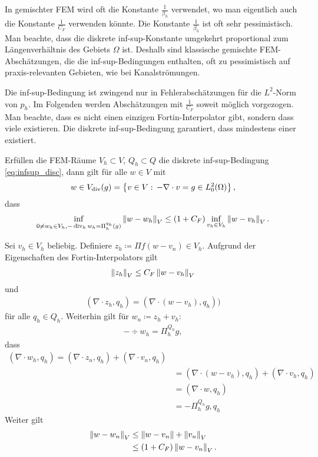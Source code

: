 \begin{bemerkung*}
  In gemischter FEM wird oft die Konstante $\frac 1 {\beta_{h}}$ verwendet, wo man eigentlich auch die Konstante $\frac 1{C_{F}}$ verwenden könnte. Die Konstante $\frac 1 {\beta_{h}}$ ist oft sehr pessimistisch. Man beachte, dass die diskrete inf-sup-Konstante umgekehrt proportional zum Längenverhältnis des Gebiets $\Omega$ ist. Deshalb sind klassische gemischte FEM-Abschätzungen, die die inf-sup-Bedingungen enthalten, oft zu pessimistisch auf praxis-relevanten Gebieten, wie bei Kanalströmungen. 

Die inf-sup-Bedingung ist zwingend nur in Fehlerabschätzungen für die $L^{2}$-Norm von $p_{h}$. Im Folgenden werden Abschätzungen mit $\frac 1 {C_{F}}$ soweit möglich vorgezogen. Man beachte, dass es nicht einen einzigen Fortin-Interpolator gibt, sondern dass viele existieren. Die diskrete inf-sup-Bedingung garantiert, dass mindestens einer existiert.  
\end{bemerkung*}
\begin{lemma}
  Erfüllen die FEM-Räume $V_{h} \subset V$, $Q_{h}\subset Q$ die diskrete inf-sup-Bedingung \eqref{eq:infsup_disc}, dann gilt für alle $w \in V$ mit
  \begin{align*}
    w \in V_{\operatorname{div}}(g) = \left\{ v \in V: \, - \nabla \cdot v = g \in L_{0}^{2}(\Omega) \right\}, 
  \end{align*}
dass
\begin{align*}
  \inf_{0 \neq w_{h} \in V_{h}, - \operatorname{div}_{h} w_{h} = \Pi_{h}^{q_{h}}(g)} \left \|w - w_{h} \right\|_{V} \leq (1 + C_{F}) \inf_{v_{h} \in V_{h}}\left \|w - v_{h} \right\|_{V}. 
\end{align*}
\begin{beweis}
  Sei $v_{h} \in V_{h}$ beliebig. Definiere $z_{h} \coloneqq \Pi{f}(w - v_{n}) \in V_{h}$. Aufgrund der Eigenschaften des Fortin-Interpolators gilt
  \begin{align*}
    \left \|z_{h} \right\|_{V} \leq C_{F}\left \|w - v_{h} \right\|_{V} 
  \end{align*}
und
\begin{align*}
  (\nabla\cdot z_{h}, q_{h}) = (\nabla \cdot (w - v_{h}), q_{h}))
\end{align*}
für alle $q_{h} \in Q_{h}$. Weiterhin gilt für $w_{n} \coloneqq z_{h} + v_{h}$:
\begin{align*}
  - \div w_{h} = \Pi_{h}^{Q_{h}} g, 
\end{align*}
dass
\begin{align*}
  (\nabla\cdot w_{h}, q_{h}) = (\nabla\cdot z_{n}, q_{h}) + (\nabla\cdot v_{n},q_{h}) \\
&= (\nabla\cdot (w-v_{h}), q_{h}) + (\nabla\cdot v_{h}, q_{h})\\
&= (\nabla\cdot w, q_{h}) \\
&= - {\Pi_{h}^{Q_{h}} g, q_{h}}
\end{align*}
Weiter gilt
\begin{align*}
  \left \|w- w_{n} \right\|_{V} &\leq \left \|w - v_{n} \right\| + \left \|v_{n} \right\|_{V}\\
& \leq (1 + C_{F}) \left \|w - v_{n} \right\|_{V}.
\end{align*}
\end{beweis}
\end{lemma}
